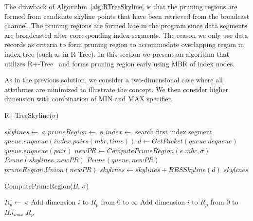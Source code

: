 \documentclass{sig-alternate}
\begin{document}
The drawback of Algorithm~\ref{alg:RTreeSkyline} is that the pruning
regions are formed from candidate skyline points that have been
retrieved from the broadcast channel. The pruning regions are formed
late in the program since data segments are broadcasted after
corresponding index segments. The reason we only use data records as
criteria to form pruning region to accommodate overlapping region in
index tree (such as in R-Tree). In this section we present an algorithm
that utilizes R+-Tree~\cite{DBLP:conf/vldb/SellisRF87} and
forms pruning region early using MBR of index nodes.

As in the previous solution, we consider a two-dimensional case
where all attributes are minimized to illustrate the concept. We then
consider higher dimension with combination of MIN and MAX specifier.

\begin{algorithm}
\caption{R+TreeSkyline($\sigma$)}
\label{alg:R+TreeSkyline}
\begin{algorithmic}[1]

\STATE $skylines \gets$ \o
\STATE $pruneRegion \gets$ \o
\STATE $index \gets$ search first index segment
\STATE $queue.enqueue(index.pairs(mbr, time))$
	\STATE $d \gets GetPacket(queue.dequeue)$
				\STATE $queue.enqueue(pair)$
                \STATE $newPR \gets ComputePruneRegion(e.mbr, \sigma)$
			    \STATE $Prune(skylines, newPR)$
                \STATE $Prune(queue, newPR)$
                \STATE $pruneRegion.Union(newPR)$
            \ENDIF
		\ENDFOR
	\ELSE
		\STATE $skylines \gets skylines + BBSSkyline(d)$
	\ENDIF
\ENDWHILE
\RETURN $skylines$
\end{algorithmic}
\end{algorithm}

\begin{algorithm}
\caption{ComputePruneRegion($B$, $\sigma$)}
\label{alg:ComputePruneRegion2}
\begin{algorithmic}[1]
\STATE $R_p \gets$ \o
{}
        \STATE Add dimension $i$ to $R_p$ from 0 to $\infty$
    \ELSE
        \STATE Add dimension $i$ to $R_p$ from 0 to $B.i_{max}$
    \ENDIF
\ENDFOR
\RETURN $R_p$
\end{algorithmic}
\end{algorithm}
\end{document}
